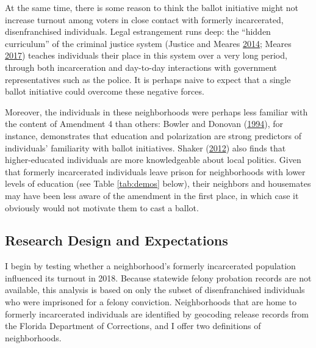 \documentclass[
  12pt,
]{article}
\begin{document}
At the same time, there is some reason to think the ballot initiative might not increase turnout among voters in close contact with formerly incarcerated, disenfranchised individuals. Legal estrangement runs deep: the ``hidden curriculum'' of the criminal justice system (Justice and Meares \protect\hyperlink{ref-Justice2014}{2014}; Meares \protect\hyperlink{ref-Meares2017}{2017}) teaches individuals their place in this system over a very long period, through both incarceration and day-to-day interactions with government representatives such as the police. It is perhaps naive to expect that a single ballot initiative could overcome these negative forces.

Moreover, the individuals in these neighborhoods were perhaps less familiar with the content of Amendment 4 than others: Bowler and Donovan (\protect\hyperlink{ref-Bowler1994}{1994}), for instance, demonstrates that education and polarization are strong predictors of individuals' familiarity with ballot initiatives. Shaker (\protect\hyperlink{ref-Shaker2012}{2012}) also finds that higher-educated individuals are more knowledgeable about local politics. Given that formerly incarcerated individuals leave prison for neighborhoods with lower levels of education (see Table \ref{tab:demos} below), their neighbors and housemates may have been less aware of the amendment in the first place, in which case it obviously would not motivate them to cast a ballot.

\hypertarget{research-design-and-expectations}{%
\subsection*{Research Design and Expectations}\label{research-design-and-expectations}}

I begin by testing whether a neighborhood's formerly incarcerated population influenced its turnout in 2018. Because statewide felony probation records are not available, this analysis is based on only the subset of disenfranchised individuals who were imprisoned for a felony conviction. Neighborhoods that are home to formerly incarcerated individuals are identified by geocoding release records from the Florida Department of Corrections, and I offer two definitions of neighborhoods.
\end{document}
